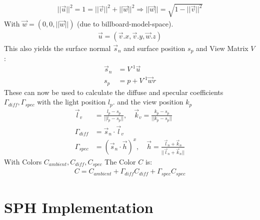 \documentclass{ACGSeminar}
\begin{document}
\begin{equation} 
\begin{aligned}
||\vec{u}||^2 = 1 = ||\vec{v}||^2 + ||\vec{w}||^2 \Rightarrow ||\vec{w}|| = \sqrt{1 - ||\vec{v}||^2}
\end{aligned}
\end{equation}
With \(\vec{w} = (0,0,||\vec{w}||)\) (due to billboard-model-space).
\begin{equation}
\begin{aligned}
\vec{u} = (\vec{v}.x, \vec{v}.y, \vec{w}.z)
\end{aligned}
\end{equation}
This also yields the surface normal \(\vec{s}_n\) and surface position \(s_p\) and View Matrix \(V\):
\begin{equation}
\begin{aligned}
\vec{s}_n &= V^{\text{-}1} \vec{u} \\
s_p &= p + V^{\text{-}1} \vec{w} r
\end{aligned}
\end{equation}
These can now be used to calculate the diffuse and specular coefficients \(\Gamma_{diff}, \Gamma_{spec}\) with the light position \(l_{p}\). and the view position \(k_{p}\)
\begin{equation} 
\begin{aligned}
\vec{l}_v &= \frac{l_p - s_p}{||l_p - s_p||}, \quad \vec{k}_v  = \frac{k_p - s_p}{||k_p - s_p||} \\
\Gamma_{diff} &= \vec{s}_n \cdot \vec{l}_v \\
\Gamma_{spec} &= ( \vec{s}_n \cdot \vec{h}) ^ x, \quad \vec{h} = \frac{\vec{l}_n + \vec{k}_n}{||\vec{l}_n + \vec{k}_n||}
\end{aligned}
\end{equation}
With Colors \(C_{ambient}, C_{diff}, C_{spec}\) The Color \(C\) is:
\begin{equation}
\begin{aligned}
C = C_{ambient} + \Gamma_{diff} C_{diff} + \Gamma_{spec} C_{spec}
\end{aligned}
\end{equation}



\section{SPH Implementation}
\end{document}
